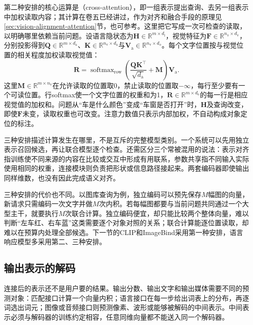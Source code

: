 第二种安排的核心运算是（cross-attention），即一组表示提出查询、去另一组表示中加权读取内容；其计算在卷五已经讲过，作为对齐和融合手段的原理见\ref{sec:vision-alignment-attention}节，也可参考。这里把它写成一次可检查的读取，以明确哪里依赖当前问题。设语言隐状态为$\bm H\in\mathbb R^{m\times d_{\mathrm l}}$，视觉特征为$\bm F\in\mathbb R^{n_{\mathrm v}\times d_{\mathrm v}}$，分别投影得到$\bm Q\in\mathbb R^{m\times d_{\mathrm a}}$、$\bm K\in\mathbb R^{n_{\mathrm v}\times d_{\mathrm a}}$与$\bm V_{\mathrm a}\in\mathbb R^{n_{\mathrm v}\times d_{\mathrm o}}$。每个文字位置按与视觉位置的相关程度加权读取视觉值：
\begin{equation}
  \bm R=\operatorname{softmax}_{\mathrm{row}}
     \left(\frac{\bm Q\bm K^\top}{\sqrt{d_{\mathrm a}}}+\bm M\right)
     \bm V_{\mathrm a}.
  \label{eq:vision-models-cross-read}
\end{equation}
这里$\bm M\in\mathbb R^{m\times n_{\mathrm v}}$在允许读取的位置取0，禁止读取的位置取$-\infty$，每行至少要有一个可读位置。行softmax使一个文字位置的权重和为1，$\bm R\in\mathbb R^{m\times d_{\mathrm o}}$的每一行是相应视觉值的加权和。问题从“车是什么颜色”变成“车窗是否打开”时，$\bm H$及查询改变，即使$\bm F$未变，读取权重也可改变。注意力数值只表示内部加权，不自动构成对象定位的标注。

三种安排描述计算发生在哪里，不是互斥的完整模型类别。一个系统可以先用独立表示召回候选，再让联合模型逐个检查。还需区分三个常被混用的说法：表示对齐指训练使不同来源的内容在比较或交互中形成有用联系，参数共享指不同输入实际使用相同的权重，连接模块则负责把形状或信息路径接起来。两套编码器即使输出同样维数，也没有因此完成语义对齐。

三种安排的代价也不同。以图库查询为例，独立编码可以预先保存$M$幅图的向量，新请求只需编码一次文字并做$M$次内积。若每幅图都要与当前问题共同通过一个大型主干，就要执行$M$次联合计算。独立编码便宜，却只能比较两个整体向量，难以判断“左车红、右车蓝”这类需要逐个对象对照的关系；联合计算能逐位置读取，却难以在预算内处理全部候选。下一节的CLIP和ImageBind采用第一种安排，语言响应模型多采用第二、三种安排。

\subsection{输出表示的解码}
\label{sec:vision-models-output}

连接后的表示还不是用户要的结果。输出分数、输出文字和输出媒体需要不同的预测对象：匹配接口计算一个向量内积；语言接口在每一步给出词表上的分布，再逐词选出词元；图像或音频接口则预测像素、波形或能够被解码的中间表示。中间表示必须与解码器的训练约定相容，任意同维向量都不能送入同一个解码器。

